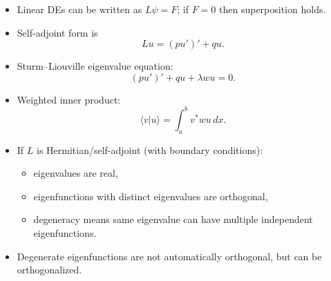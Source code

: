 \begin{itemize}
\item Linear DEs can be written as $L\psi=F$; if $F=0$ then superposition holds.
\item Self-adjoint form is
\[
Lu=(pu')'+qu.
\]
\item Sturm--Liouville eigenvalue equation:
\[
(pu')'+qu+\lambda w u=0.
\]
\item Weighted inner product:
\[
\langle v|u\rangle=\int_a^b v^*wu\,dx.
\]
\item If $L$ is Hermitian/self-adjoint (with boundary conditions):
\begin{itemize}
\item eigenvalues are real,
\item eigenfunctions with distinct eigenvalues are orthogonal,
\item degeneracy means same eigenvalue can have multiple independent eigenfunctions.
\end{itemize}
\item Degenerate eigenfunctions are not automatically orthogonal, but can be orthogonalized.
\end{itemize}
